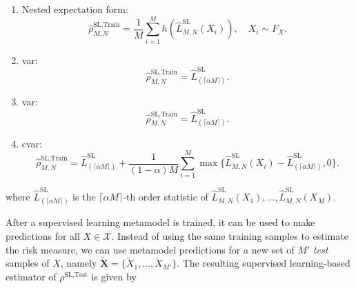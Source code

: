 \begin{enumerate}
    \item   Nested expectation form:
            \begin{equation}\label{eq1:sl-train}
                \hat{\rho}^{\text{SL}, \text{Train}}_{M, N} = \frac{1}{M} \sum_{i=1}^M h(\hat{L}^{\text{SL}}_{M, N}(X_i)), \quad X_i \sim F_X.
            \end{equation}
    \item   \gls{var}:
            \begin{equation*}
              \hat{\rho}^{\text{SL}, \text{Train}}_{M, N} = \hat{L}^{\text{SL}}_{(\lceil \alpha M \rceil)}.  
            \end{equation*}
    \item   \gls{var}:
            \begin{equation*}
              \hat{\rho}^{\text{SL}, \text{Train}}_{M, N} = \hat{L}^{\text{SL}}_{(\lceil \alpha M \rceil)}.  
            \end{equation*}
    \item   \gls{cvar}:
            \begin{equation*}
                \hat{\rho}^{\text{SL}, \text{Train}}_{M, N} = \hat{L}^{\text{SL}}_{(\lceil \alpha M \rceil)} + \frac{1}{(1-\alpha) M} \sum_{i=1}^M \max \{\hat{L}^{\text{SL}}_{M, N}(X_i) - \hat{L}^{\text{SL}}_{(\lceil \alpha M \rceil)}, 0 \}.
            \end{equation*}
\end{enumerate}
where $\hat{L}^{\text{SL}}_{(\lceil \alpha M \rceil)}$ is the $\lceil \alpha M \rceil$-th order statistic of $\hat{L}^{\text{SL}}_{M, N}(X_1), \dots, \hat{L}^{\text{SL}}_{M, N}(X_M)$.

After a supervised learning metamodel is trained, it can be used to make predictions for all $X \in \mathcal{X}$.
Instead of using the same training samples to estimate the risk measure, we can use metamodel predictions for a new set of $M'$ \textit{test} samples of $X$, namely $\tilde{\mathbf{X}} = \{\tilde{X}_1, \dots, \tilde{X}_{M'}\}$.
The resulting supervised learning-based estimator of $\rho^{\text{SL}, \text{Test}}$ is given by

